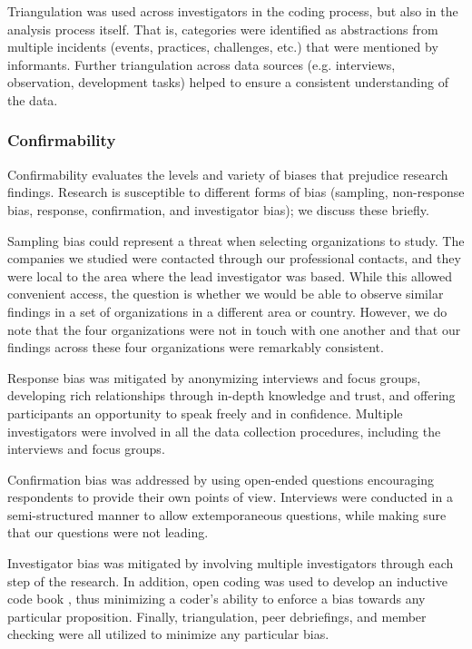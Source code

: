 \documentclass[smallextended]{svjour3}       %
\begin{document}
Triangulation was used across investigators in the coding process, but also in the analysis process itself. That is, categories were identified as abstractions from multiple incidents (events, practices, challenges, etc.) that were mentioned by informants. Further triangulation across data sources (e.g. interviews, observation, development tasks) helped to ensure a consistent understanding of the data. 


\subsubsection{Confirmability}

Confirmability evaluates the levels and variety of biases that prejudice research findings.
Research is susceptible to different forms of bias (sampling, non-response bias, response, confirmation, and investigator bias); we discuss these briefly.

{Sampling bias} could represent a threat when selecting organizations to study. The companies we studied were contacted through our professional contacts, and they were local to the area where the lead investigator was based. While this allowed convenient access, the question is whether we would be able to observe similar findings in a set of organizations in a different area or country. However, we do note that the four organizations were not in touch with one another and that our findings across these four organizations were remarkably consistent.



{Response bias} was mitigated by anonymizing interviews and focus groups, developing rich relationships through in-depth knowledge and trust, and offering participants an opportunity to speak freely and in confidence.
Multiple investigators were involved in all the data collection procedures, including the interviews and focus groups. 

{Confirmation bias} was addressed by using open-ended questions encouraging respondents to provide their own points of view. 
Interviews were conducted in a semi-structured manner to allow extemporaneous questions,  
while making sure that our questions were not leading.

{Investigator bias} was mitigated by involving multiple investigators through each step of the research.
In addition, open coding \citep{corbin1990grounded} was used to develop an inductive code book \citep{cruzes_recommended_2011}, thus minimizing a coder's ability to enforce a bias towards any particular proposition.
Finally, triangulation, peer debriefings, and member checking were all utilized to minimize any particular bias.
\end{document}
